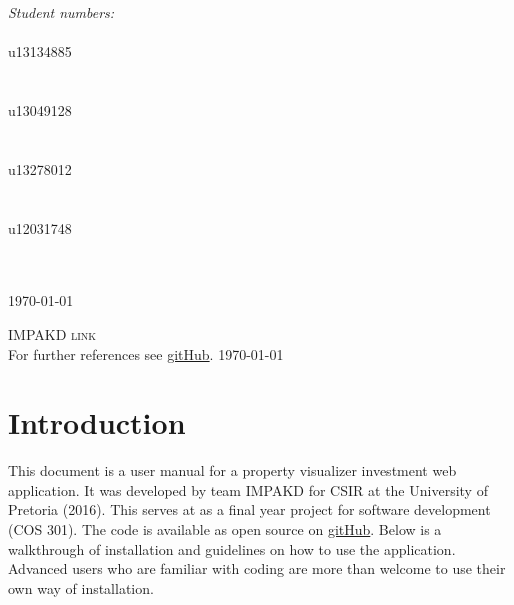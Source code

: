 \documentclass[a4paper,12pt]{article}
\begin{document}
\begin{titlepage}
\begin{center}
\begin{minipage}{0.4\textwidth}
\begin{flushright}
\emph{ \Large Student numbers:} \\[0.4cm]  
\emph{}\\
{\Large u13134885}\\
\emph{}\\
\emph{}\\
{\Large u13049128}\\
\emph{}\\
\emph{}\\
{\Large u13278012}\\
\emph{}\\
\emph{}\\
{\Large u12031748}\\
\emph{}\\
\emph{}\\

\end{flushright}
\end{minipage}


{\large \today}
\end{center}
\end{titlepage}
\renewcommand{\thesection}{\arabic{section}}

\newpage
\begin{center}
\textsc{\Large IMPAKD link}\\[0.5cm]
For further references see \href{https://github.com/u13278012/IMPAKD/}{gitHub}.
\today
\end{center}
\cleardoublepage
\thispagestyle{empty}
\tableofcontents

\newpage
\setcounter{page}{3} 
\section{Introduction}
This document is a user manual for a property visualizer investment web application. It was developed by team IMPAKD for CSIR at the University of Pretoria (2016). This serves at as a final year project for software development (COS 301). The code is available as open source on \href{https://github.com/u13278012/IMPAKD/}{gitHub}. Below is a walkthrough of installation and guidelines on how to use the application. Advanced users who are familiar with coding are more than welcome to use their own way of installation. 
\end{document}
